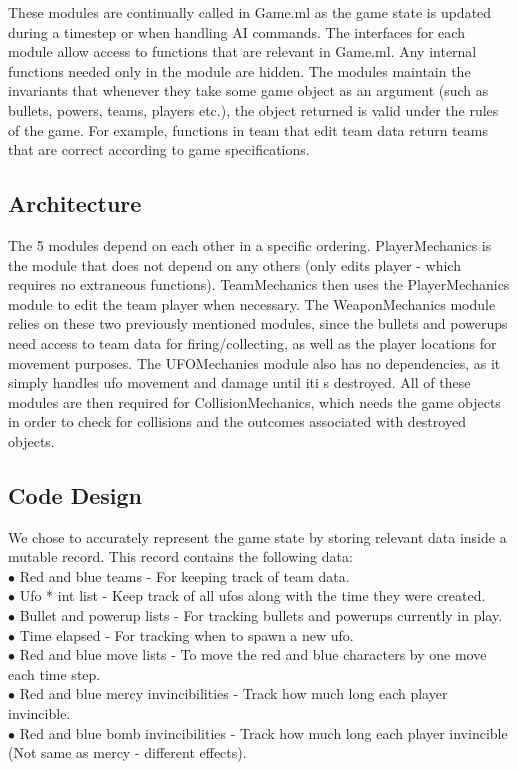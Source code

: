 \documentclass{article}
\begin{document}
These modules are continually called in Game.ml as the game state is updated during a timestep or when handling AI commands. The interfaces for each module
allow access to  functions that are relevant in Game.ml. Any internal functions needed only in the module are hidden. The modules maintain the invariants that whenever they take some game object as an argument (such as bullets, powers, teams, players etc.), the object returned is valid under the rules of the game. For example, functions in team that edit team data return teams that are correct according to game specifications.

\subsection{Architecture}
The 5 modules depend on each other in a specific ordering. PlayerMechanics is the module that does not depend on any others (only edits player - which requires no extraneous functions). TeamMechanics then uses the PlayerMechanics module to edit the team player when necessary. The WeaponMechanics module relies on these two previously mentioned modules, since the bullets and powerups need access to team data for firing/collecting, as well as the player locations for movement purposes. The UFOMechanics module also has no dependencies, as it simply handles ufo movement and damage until iti s destroyed. All of these modules are then required for CollisionMechanics, which needs the game objects in order to check for collisions and the outcomes associated with destroyed objects.

\subsection{Code Design}
We chose to accurately represent the game state by storing relevant data inside a mutable record. This record contains the following data: \\
$\bullet$ Red and blue teams - For keeping track of team data. \\
$\bullet$ Ufo * int list - Keep track of all ufos along with the time they were created. \\
$\bullet$ Bullet and powerup lists - For tracking bullets and powerups currently in play. \\
$\bullet$ Time elapsed - For tracking when to spawn a new ufo. \\
$\bullet$ Red and blue move lists - To move the red and blue characters by one move each time step. \\
$\bullet$ Red and blue mercy invincibilities - Track how much long each player invincible. \\
$\bullet$ Red and blue bomb invincibilities - Track how much long each player invincible (Not same as mercy - different effects). \\
\end{document}
